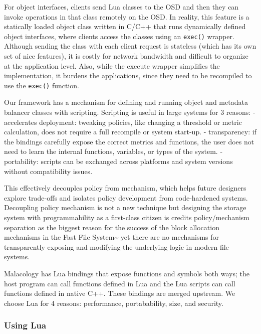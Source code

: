 \documentclass[10pt,twocolumn]{article}
\begin{document}
For object interfaces, clients send Lua classes to the OSD and then they
can invoke operations in that class remotely on the OSD. In reality,
this feature is a statically loaded object class written in C/C++ that
runs dynamically defined object interfaces, where clients access the
classes using an \texttt{exec()} wrapper. Although sending the class
with each client request is stateless (which has its own set of nice
features), it is costly for network bandwidth and difficult to organize
at the application level. Also, while the execute wrapper simplifies the
implementation, it burdens the applications, since they need to be
recompiled to use the \texttt{exec()} function.

Our framework has a mechanism for defining and running object and
metadata balancer classes with scripting. Scripting is useful in large
systems for 3 reasons: - accelerates deployment: tweaking policies, like
changing a threshold or metric calculation, does not require a full
recompile or system start-up. - transparency: if the bindings carefully
expose the correct metrics and functions, the user does not need to
learn the internal functions, variables, or types of the system. -
portability: scripts can be exchanged across platforms and system
versions without compatibility issues.

This effectively decouples policy from mechanism, which helps future
designers explore trade-offs and isolates policy development from
code-hardened systems. Decoupling policy mechanism is not a new
technique but designing the storage system with programmability as a
first-class citizen is credits policy/mechanism separation as the
biggest reason for the success of the block allocation mechanisms in the
Fast File System\textasciitilde{}\autocite{mckusick:fast2015-FFS} yet there
are no mechanisms for transparently exposing and modifying the
underlying logic in modern file systems.

Malacology has Lua bindings that expose functions and symbols both ways;
the host program can call functions defined in Lua and the Lua scripts
can call functions defined in native C++. These bindings are merged
upstream. We choose Lua for 4 reasons: performance, portabability, size,
and security.

\subsubsection{Using Lua}\label{using-lua}
\end{document}
